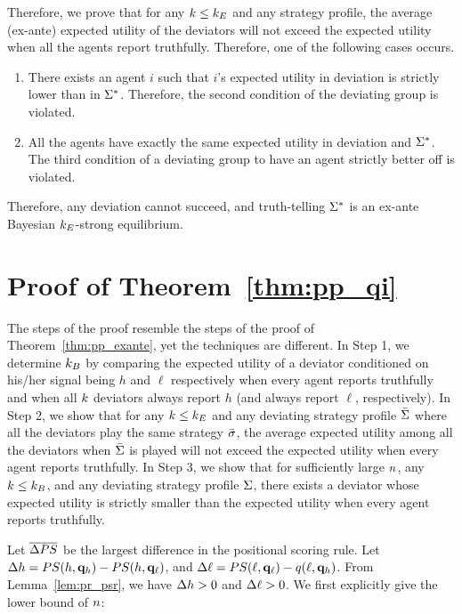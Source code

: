 Therefore, we prove that for any $k\le k_E$ and any strategy profile, the average (ex-ante) expected utility of the deviators will not exceed the expected utility when all the agents report truthfully. Therefore, one of the following cases occurs. 
\begin{enumerate}
    \item There exists an agent $i$ such that $i$'s expected utility in deviation is strictly lower than in $\Sigma^*$. Therefore, the second condition of the deviating group is violated. 
    \item All the agents have exactly the same expected utility in deviation and $\Sigma^*$. The third condition of a deviating group to have an agent strictly better off is violated. 
\end{enumerate}
Therefore, any deviation cannot succeed, and truth-telling $\Sigma^*$ is an ex-ante Bayesian $k_E$-strong equilibrium. 

\section{Proof of Theorem~\ref{thm:pp_qi}}
\label{apx:qi}
The steps of the proof resemble the steps of the proof of Theorem~\ref{thm:pp_exante}, yet the techniques are different. In Step 1, we determine $k_B$ by comparing the \qi{} expected utility of a deviator conditioned on his/her signal being $h$ and $\ell$ respectively when every agent reports truthfully and when all $k$ deviators always report $h$ (and always report $\ell$, respectively).
In Step 2, we show that for any $k \le k_E$ and any deviating strategy profile $\bar{\Sigma}$ where all the deviators play the same strategy $\bar{\sigma}$, the average expected utility among all the deviators when $\bar{\Sigma}$ is played will not exceed the expected utility when every agent reports truthfully. In Step 3, we show that for sufficiently large $n$, any $k \le k_B$, and any deviating strategy profile $\Sigma$, there exists a deviator whose expected utility is strictly smaller than the expected utility when every agent reports truthfully.

Let $\overline{\Delta PS}$ be the largest difference in the positional scoring rule. Let $\Delta h = PS(h, \mathbf{q}_h) - PS(h, \mathbf{q}_\ell)$, and $\Delta \ell = PS(\ell, \mathbf{q}_{\ell}) - q(\ell, \mathbf{q}_h)$. From Lemma~\ref{lem:pr_psr}, we have $\Delta h > 0$ and $\Delta \ell > 0$. We first explicitly give the lower bound of $n$:

